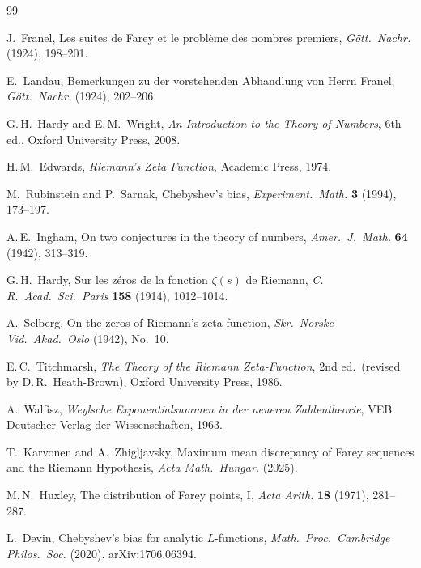 \documentclass[11pt]{article}
\theoremstyle{definition}
\begin{document}
\begin{thebibliography}{99}

J.~Franel, Les suites de Farey et le probl\`eme des nombres
premiers, \emph{G\"ott.\ Nachr.} (1924), 198--201.

E.~Landau, Bemerkungen zu der vorstehenden Abhandlung von Herrn
Franel, \emph{G\"ott.\ Nachr.} (1924), 202--206.

G.\,H.~Hardy and E.\,M.~Wright, \emph{An Introduction to the Theory
of Numbers}, 6th ed., Oxford University Press, 2008.

H.\,M.~Edwards, \emph{Riemann's Zeta Function}, Academic Press, 1974.

M.~Rubinstein and P.~Sarnak, Chebyshev's bias,
\emph{Experiment.\ Math.} \textbf{3} (1994), 173--197.

A.\,E.~Ingham, On two conjectures in the theory of numbers,
\emph{Amer.\ J.\ Math.} \textbf{64} (1942), 313--319.

G.\,H.~Hardy, Sur les z\'eros de la fonction $\zeta(s)$ de Riemann,
\emph{C.\,R.\ Acad.\ Sci.\ Paris} \textbf{158} (1914), 1012--1014.

A.~Selberg, On the zeros of Riemann's zeta-function,
\emph{Skr.\ Norske Vid.\ Akad.\ Oslo} (1942), No.~10.

E.\,C.~Titchmarsh, \emph{The Theory of the Riemann Zeta-Function},
2nd ed.\ (revised by D.\,R.~Heath-Brown), Oxford University Press, 1986.

A.~Walfisz, \emph{Weylsche Exponentialsummen in der neueren
Zahlentheorie}, VEB Deutscher Verlag der Wissenschaften, 1963.

T.~Karvonen and A.~Zhigljavsky, Maximum mean discrepancy of Farey
sequences and the Riemann Hypothesis,
\emph{Acta Math.\ Hungar.} (2025).

M.\,N.~Huxley, The distribution of Farey points, I,
\emph{Acta Arith.} \textbf{18} (1971), 281--287.

L.~Devin, Chebyshev's bias for analytic $L$-functions,
\emph{Math.\ Proc.\ Cambridge Philos.\ Soc.} (2020).
arXiv:1706.06394.


\end{thebibliography}
\end{document}
